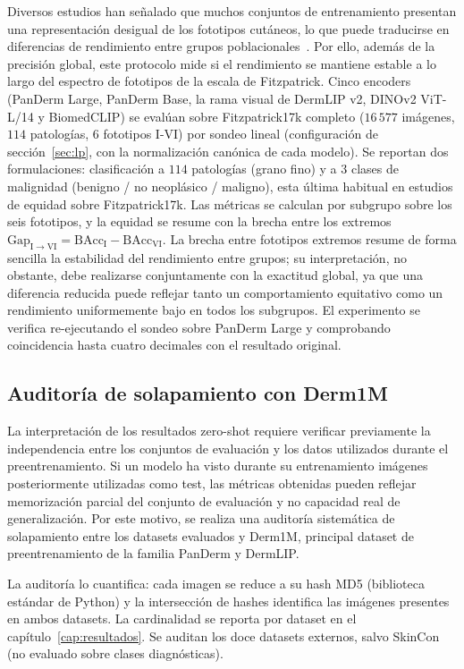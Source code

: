 Diversos estudios han señalado que muchos conjuntos de entrenamiento
presentan una representación desigual de los fototipos cutáneos, lo
que puede traducirse en diferencias de rendimiento entre grupos
poblacionales~\cite{ddi}. Por ello, además de la precisión global,
este protocolo mide si el rendimiento se mantiene estable a lo largo
del espectro de fototipos de la escala de Fitzpatrick. Cinco
encoders (PanDerm Large, PanDerm Base, la rama
visual de DermLIP v2, DINOv2 ViT-L/14 y BiomedCLIP) se evalúan sobre
Fitzpatrick17k completo ($16\,577$ imágenes, $114$ patologías,
$6$ fototipos I-VI) por sondeo lineal (configuración de
sección~\ref{sec:lp}, con la normalización canónica de cada
modelo). Se reportan dos formulaciones: clasificación a $114$
patologías (grano fino) y a $3$ clases de malignidad
(benigno / no neoplásico / maligno), esta última habitual en
estudios de equidad sobre Fitzpatrick17k. Las métricas se calculan
por subgrupo sobre los seis fototipos, y la equidad se resume con la
brecha entre los extremos
$\mathrm{Gap}_{\mathrm{I}\to\mathrm{VI}} =
\mathrm{BAcc}_{\mathrm{I}} - \mathrm{BAcc}_{\mathrm{VI}}$. La
brecha entre fototipos extremos resume de forma sencilla la
estabilidad del rendimiento entre grupos; su interpretación, no
obstante, debe realizarse conjuntamente con la exactitud global, ya
que una diferencia reducida puede reflejar tanto un comportamiento
equitativo como un rendimiento uniformemente bajo en todos los
subgrupos. El experimento se verifica re-ejecutando el sondeo sobre
PanDerm Large y comprobando coincidencia hasta cuatro decimales con
el resultado original.

\subsection{Auditoría de solapamiento con Derm1M}
\label{sec:auditoria}

La interpretación de los resultados zero-shot requiere verificar
previamente la independencia entre los conjuntos de evaluación y los
datos utilizados durante el preentrenamiento. Si un modelo ha visto
durante su entrenamiento imágenes posteriormente utilizadas como
test, las métricas obtenidas pueden reflejar memorización parcial
del conjunto de evaluación y no capacidad real de generalización.
Por este motivo, se realiza una auditoría sistemática de
solapamiento entre los datasets evaluados y Derm1M, principal
dataset de preentrenamiento de la familia PanDerm y DermLIP.

La auditoría lo cuantifica: cada imagen se reduce
a su hash MD5 (biblioteca estándar de Python) y la intersección de
hashes identifica las imágenes presentes en ambos datasets. La
cardinalidad se reporta por dataset en el
capítulo~\ref{cap:resultados}. Se auditan los doce datasets
externos, salvo SkinCon (no evaluado sobre clases diagnósticas).


